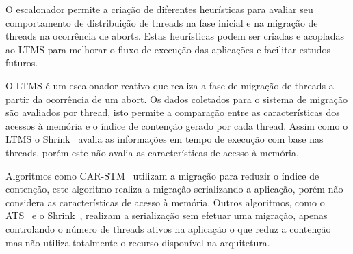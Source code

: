 \documentclass[diss,capa]{texufpel}
\begin{document}
O escalonador permite a criação de diferentes heurísticas para avaliar seu comportamento de distribuição de threads na fase inicial e na migração de threads na ocorrência de aborts. Estas heurísticas podem ser criadas e acopladas ao LTMS para melhorar o fluxo de execução das aplicações e facilitar estudos futuros.

O LTMS é um escalonador reativo que realiza a fase de migração de threads a partir da ocorrência de um abort. Os dados coletados para o sistema de migração são avaliados por thread, isto permite a comparação entre as características dos acessos à memória e o índice de contenção gerado por cada thread. Assim como o LTMS o Shrink~\cite{shrink2009} avalia as informações em tempo de execução com base nas threads, porém este não avalia as características de acesso à memória.

Algoritmos como CAR-STM~\cite{carstm2008} utilizam a migração para reduzir o índice de contenção, este algoritmo realiza a migração serializando a aplicação, porém não considera as características de acesso à memória. Outros algoritmos, como o ATS~\cite{ats2008} e o Shrink~\cite{shrink2009}, realizam a serialização sem efetuar uma migração, apenas controlando o número de threads ativos na aplicação o que reduz a contenção mas não utiliza totalmente o recurso disponível na arquitetura.





\end{document}

